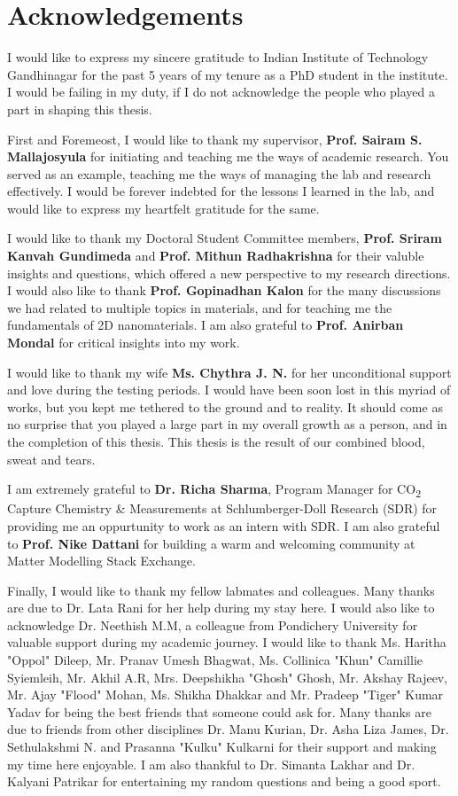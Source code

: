 \chapter*{Acknowledgements}
\justifying
I would like to express my sincere gratitude to Indian Institute of Technology Gandhinagar for the past 5 years of my tenure as a PhD student in the institute. I would be failing in my duty, if I do not acknowledge the people who played a part in shaping this thesis.

First and Foremeost, I would like to thank my supervisor, \textbf{Prof. Sairam S. Mallajosyula} for initiating and teaching me the ways of academic research. You served as an example, teaching me the ways of managing the lab and research effectively. I would be forever indebted for the lessons I learned in the lab, and would like to express my heartfelt gratitude for the same.

I would like to thank my Doctoral Student Committee members, \textbf{Prof. Sriram Kanvah Gundimeda} and \textbf{Prof. Mithun Radhakrishna} for their valuble insights and questions, which offered a new perspective to my research directions. I would also like to thank \textbf{Prof. Gopinadhan Kalon} for the many discussions we had related to multiple topics in materials, and for teaching me the fundamentals of 2D nanomaterials. I am also grateful to \textbf{Prof. Anirban Mondal} for critical insights into my work.

I would like to thank my wife \textbf{Ms. Chythra J. N.} for her unconditional support and love during the testing periods. I would have been soon lost in this myriad of works, but you kept me tethered to the ground and to reality. It should come as no surprise that you played a large part in my overall growth as a person, and in the completion of this thesis. This thesis is the result of our combined blood, sweat and tears.

I am extremely grateful to \textbf{Dr. Richa Sharma}, Program Manager for CO\textsubscript{2} Capture Chemistry \& Measurements at Schlumberger-Doll Research (SDR) for providing me an oppurtunity to work as an intern with SDR. I am also grateful to \textbf{Prof. Nike Dattani} for building a warm and welcoming community at Matter Modelling Stack Exchange.

Finally, I would like to thank my fellow labmates and colleagues. Many thanks are due to Dr. Lata Rani for her help during my stay here. I would also like to acknowledge Dr. Neethish M.M, a colleague from Pondichery University for valuable support during my academic journey. I would like to thank Ms. Haritha "Oppol" Dileep, Mr. Pranav Umesh Bhagwat, Ms. Collinica "Khun" Camillie Syiemleih, Mr. Akhil A.R, Mrs. Deepshikha "Ghosh" Ghosh, Mr. Akshay Rajeev, Mr. Ajay "Flood" Mohan, Ms. Shikha Dhakkar and Mr. Pradeep "Tiger" Kumar Yadav for being the best friends that someone could ask for. Many thanks are due to friends from other disciplines Dr. Manu Kurian, Dr. Asha Liza James, Dr. Sethulakshmi N. and Prasanna "Kulku" Kulkarni for their support and making my time here enjoyable. I am also thankful to Dr. Simanta Lakhar and Dr. Kalyani Patrikar for entertaining my random questions and being a good sport.

